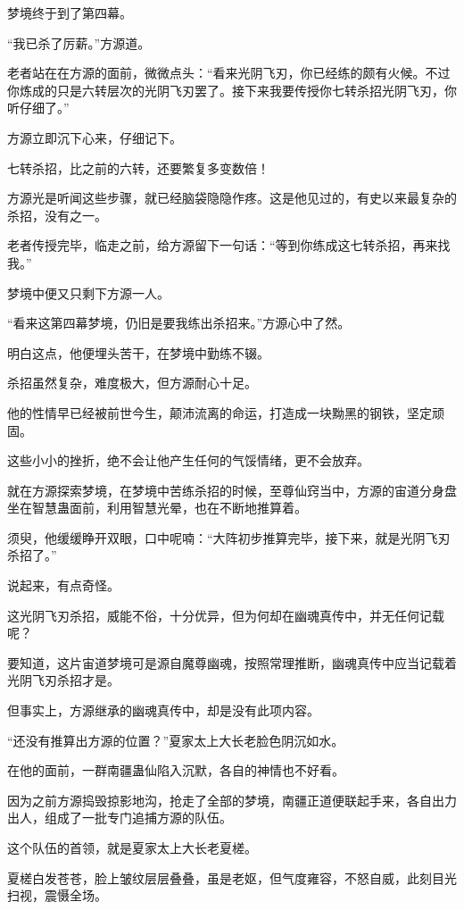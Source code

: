 
\begin{this_body}

梦境终于到了第四幕。

“我已杀了厉薪。”方源道。

老者站在在方源的面前，微微点头：“看来光阴飞刃，你已经练的颇有火候。不过你炼成的只是六转层次的光阴飞刃罢了。接下来我要传授你七转杀招光阴飞刃，你听仔细了。”

方源立即沉下心来，仔细记下。

七转杀招，比之前的六转，还要繁复多变数倍！

方源光是听闻这些步骤，就已经脑袋隐隐作疼。这是他见过的，有史以来最复杂的杀招，没有之一。

老者传授完毕，临走之前，给方源留下一句话：“等到你练成这七转杀招，再来找我。”

梦境中便又只剩下方源一人。

“看来这第四幕梦境，仍旧是要我练出杀招来。”方源心中了然。

明白这点，他便埋头苦干，在梦境中勤练不辍。

杀招虽然复杂，难度极大，但方源耐心十足。

他的性情早已经被前世今生，颠沛流离的命运，打造成一块黝黑的钢铁，坚定顽固。

这些小小的挫折，绝不会让他产生任何的气馁情绪，更不会放弃。

就在方源探索梦境，在梦境中苦练杀招的时候，至尊仙窍当中，方源的宙道分身盘坐在智慧蛊面前，利用智慧光晕，也在不断地推算着。

须臾，他缓缓睁开双眼，口中呢喃：“大阵初步推算完毕，接下来，就是光阴飞刃杀招了。”

说起来，有点奇怪。

这光阴飞刃杀招，威能不俗，十分优异，但为何却在幽魂真传中，并无任何记载呢？

要知道，这片宙道梦境可是源自魔尊幽魂，按照常理推断，幽魂真传中应当记载着光阴飞刃杀招才是。

但事实上，方源继承的幽魂真传中，却是没有此项内容。

“还没有推算出方源的位置？”夏家太上大长老脸色阴沉如水。

在他的面前，一群南疆蛊仙陷入沉默，各自的神情也不好看。

因为之前方源捣毁掠影地沟，抢走了全部的梦境，南疆正道便联起手来，各自出力出人，组成了一批专门追捕方源的队伍。

这个队伍的首领，就是夏家太上大长老夏槎。

夏槎白发苍苍，脸上皱纹层层叠叠，虽是老妪，但气度雍容，不怒自威，此刻目光扫视，震慑全场。


\end{this_body}
